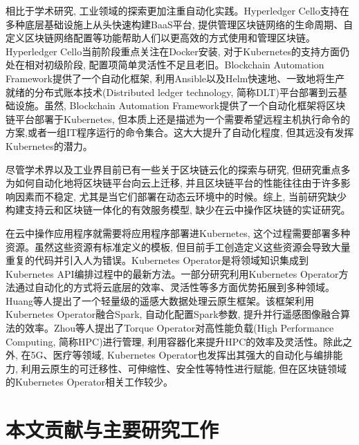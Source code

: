 相比于学术研究, 工业领域的探索更加注重自动化实践。Hyperledger Cello\footnotemark[3]支持在多种底层基础设施上从头快速构建BaaS平台, 提供管理区块链网络的生命周期、自定义区块链网络配置等功能帮助人们以更高效的方式使用和管理区块链。Hyperledger Cello当前阶段重点关注在Docker安装, 对于Kubernetes的支持方面仍处在相对初级阶段, 配置项简单灵活性不足且老旧。Blockchain Automation Framework\footnotemark[1]提供了一个自动化框架, 利用Ansible\footnotemark[2]以及Helm\footnotemark[3]快速地、一致地将生产就绪的分布式账本技术(Distributed ledger technology, 简称DLT)平台部署到云基础设施。虽然, Blockchain Automation Framework提供了一个自动化框架将区块链平台部署于Kubernetes, 但本质上还是描述为一个需要希望远程主机执行命令的方案,或者一组IT程序运行的命令集合。这大大提升了自动化程度, 但其远没有发挥Kubernetes的潜力。

尽管学术界以及工业界目前已有一些关于区块链云化的探索与研究, 但研究重点多为如何自动化地将区块链平台向云上迁移, 并且区块链平台的性能往往由于许多影响因素而不稳定, 尤其是当它们部署在动态云环境中的时候。综上, 当前研究缺少构建支持云和区块链一体化的有效服务模型\cite{9582270}, 缺少在云中操作区块链的实证研究\cite{8790849}。

在云中操作应用程序就需要将应用程序部署进Kubernetes, 这个过程需要部署多种资源。虽然这些资源有标准定义的模板, 但目前手工创造定义这些资源会导致大量重复的代码并引入人为错误。Kubernetes Operator是将领域知识集成到Kubernetes API编排过程中的最新方法\cite{henning2021reproducible}。一部分研究利用Kubernetes Operator方法通过自动化的方式将云底层的效率、灵活性等多方面优势拓展到多种领域。Huang等人\cite{huang2021fly}提出了一个轻量级的遥感大数据处理云原生框架。该框架利用Kubernetes Operator融合Spark, 自动化配置Spark参数, 提升并行遥感图像融合算法的效率。Zhou等人\cite{zhou2021container}提出了Torque Operator对高性能负载(High Performance Computing, 简称HPC)进行管理, 利用容器化来提升HPC的效率及灵活性。除此之外, 在5G\cite{arouk20205g}\cite{wiranata2020automation}、医疗\cite{rouzbeh2020unified}等领域, Kubernetes Operator也发挥出其强大的自动化与编排能力, 利用云原生的可迁移性、可伸缩性、安全性等特性进行赋能, 但在区块链领域的Kubernetes Operator相关工作较少。


\section{本文贡献与主要研究工作}

